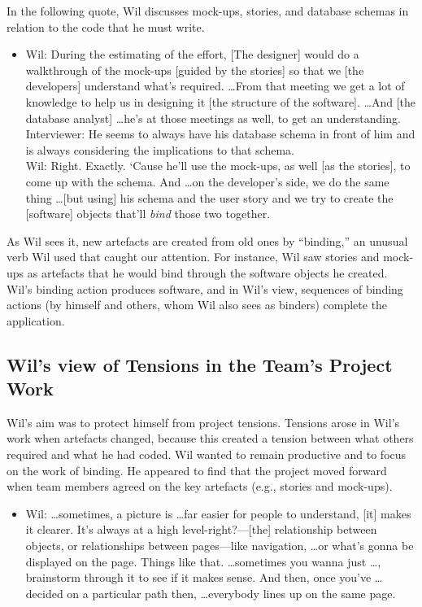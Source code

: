 \documentclass{chi2009}
\begin{document}
In the following quote, Wil discusses mock-ups, stories, and database schemas in relation to the code that he must write. 

\begin{itemize}
\item [] Wil: During the estimating of the effort, [The designer] would do a walkthrough of the mock-ups [guided by the stories] so that we [the developers] understand what's required. \ldots From that meeting we get a lot of knowledge to help us in designing it [the structure of the software]. \ldots And [the database analyst] \ldots he's at those meetings as well, to get an understanding. \\
Interviewer: He seems to always have his database schema in front of him and is always considering the implications to that schema.\\
Wil: Right. Exactly. ‘Cause he'll use the mock-ups, as well [as the stories], to come up with the schema. And \ldots on the developer's side, we do the same thing \ldots [but using] his schema and the user story and we try to create the [software] objects that'll {\it bind} those two together.
\end{itemize}

As Wil sees it, new artefacts are created from old ones by ``binding,'' an unusual verb Wil used that caught our attention. For instance, Wil saw stories and mock-ups as artefacts that he would bind through the software objects he created. Wil's binding action produces software, and in Wil's view, sequences of binding actions (by himself and others, whom Wil also sees as binders) complete the application.

\subsection{Wil's view of Tensions in the Team's Project Work} 
Wil's aim was to protect himself from project tensions. Tensions arose in Wil's work when artefacts changed, because this created a tension between what others required and what he had coded. Wil wanted to remain productive and to focus on the work of binding. He appeared to find that the project moved forward when team members agreed on the key artefacts (e.g., stories and mock-ups). 

\begin{itemize}
\item [] Wil: \ldots sometimes, a picture is \ldots far easier for people to understand, [it] makes it clearer. It's always at a  high level-right?---[the] relationship between objects, or relationships between pages---like navigation, \ldots or what's gonna be displayed on the page. Things like that. \ldots sometimes you wanna just \ldots, brainstorm through it to see if it makes sense. And then, once you've \ldots decided on a particular path then, \ldots everybody lines up on the same page. \\
\end{itemize}
\end{document}
